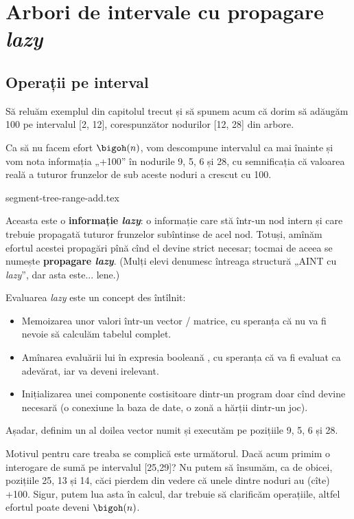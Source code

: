 \chapter{Arbori de intervale cu propagare \textit{lazy}}

\section{Operații pe interval}

Să reluăm exemplul din capitolul trecut și să spunem acum că dorim să adăugăm 100 pe intervalul [2, 12], corespunzător nodurilor [12, 28] din arbore.

Ca să nu facem efort $\bigoh(n)$, vom descompune intervalul ca mai înainte și vom nota informația „+100” în nodurile 9, 5, 6 și 28, cu semnificația că valoarea reală a tuturor frunzelor de sub aceste noduri a crescut cu 100.

{segment-tree-range-add.tex}

Aceasta este o \textbf{informație \textit{lazy}}: o informație care stă într-un nod intern și care trebuie propagată tuturor frunzelor subîntinse de acel nod. Totuși, amînăm efortul acestei propagări pînă cînd el devine strict necesar; tocmai de aceea se numește \textbf{propagare \textit{lazy}}. (Mulți elevi denumesc întreaga structură „AINT cu \textit{lazy}”, dar asta este... lene.)

Evaluarea \textit{lazy} este un concept des întîlnit:

\begin{itemize}
  \item Memoizarea unor valori într-un vector / matrice, cu speranța că nu va fi nevoie să calculăm tabelul complet.

  \item Amînarea evaluării lui  în expresia booleană , cu speranța că  va fi evaluat ca adevărat, iar  va deveni irelevant.

  \item Inițializarea unei componente costisitoare dintr-un program doar cînd devine necesară (o conexiune la baza de date, o zonă a hărții dintr-un joc).
\end{itemize}

Așadar, definim un al doilea vector numit  și executăm  pe pozițiile 9, 5, 6 și 28.

Motivul pentru care treaba se complică este următorul. Dacă acum primim o interogare de sumă pe intervalul [25,29]? Nu putem să însumăm, ca de obicei, pozițiile 25, 13 și 14, căci pierdem din vedere că unele dintre noduri au (cîte) +100. Sigur, putem lua asta în calcul, dar trebuie să clarificăm operațiile, altfel efortul poate deveni $\bigoh(n)$.

